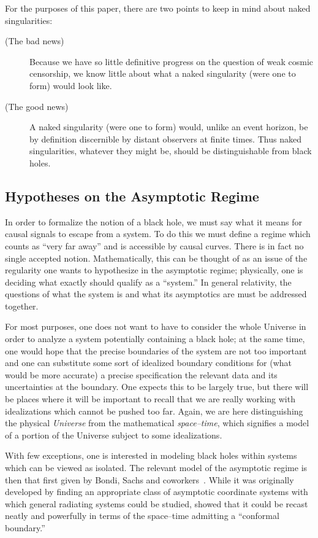 \documentclass[12pt]{article}
\begin{document}
For the purposes of this paper, there are two points to keep in mind about naked singularities:
\begin{description}
\item[(The bad news)]  Because we have so little definitive progress on the question of weak cosmic censorship, we know little about what a naked singularity (were one to form) would look like.

\item[(The good news)]  A naked singularity (were one to form) would, unlike an event horizon, be by definition discernible by distant observers at finite times.  Thus naked singularities, whatever they might be, should be distinguishable from black holes.

\end{description}

\subsection{Hypotheses on the Asymptotic Regime}

In order to formalize the notion of a black hole, we must say what it means for causal signals to escape from a system. 
 To do this we must define a regime which counts as ``very far away'' and is accessible by causal curves.  There is in fact no single accepted notion.  Mathematically, this can be thought of as an issue of the regularity one wants to  hypothesize in the asymptotic regime; physically, one is deciding what exactly should qualify as a ``system.''  In general relativity, the questions of what the system is and what its asymptotics are must be addressed together.

For most purposes, one does not want to have to consider the whole Universe in order to analyze a system potentially containing a black hole; at the same time, one would hope that the precise boundaries of the system are not too important and one can substitute some sort of idealized boundary conditions for (what would be more accurate) a precise specification the relevant data and its uncertainties at the boundary.  One expects this to be largely true, but there will be places where it will be important to recall that we are really working with idealizations which cannot be pushed too far.  Again, we are here distinguishing the physical {\em Universe} from the mathematical {\em space--time}, which signifies a model of a portion of the Universe subject to some idealizations.

With few exceptions, one is interested in modeling black holes within systems which can be viewed as isolated.  The relevant model of the asymptotic regime is then that first given by Bondi, Sachs and coworkers~\citep{Bondi:1962,Sachs:1962}.
While it was 
originally developed by finding an appropriate class of asymptotic coordinate systems with which general radiating systems could be studied, \citet{Penrose:1964} showed that it could be recast neatly and powerfully in terms of the space--time admitting a ``conformal boundary.'' 
\end{document}

